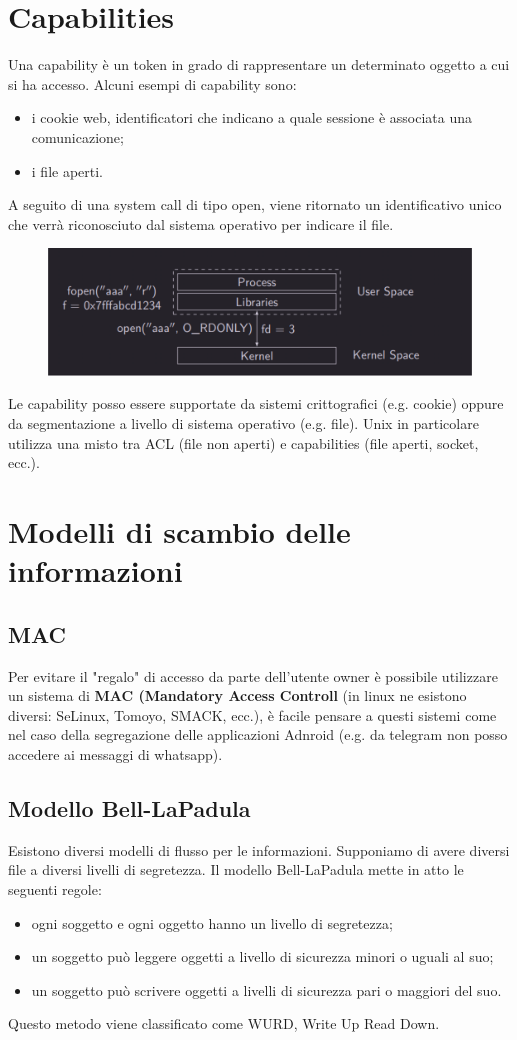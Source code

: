 \section{Capabilities}
Una capability è un token in grado di rappresentare un determinato oggetto a cui si ha accesso. Alcuni esempi di capability sono: 
\begin{itemize}
    \item i cookie web, identificatori che indicano a quale sessione è associata una comunicazione;
    \item i file aperti.
\end{itemize}
A seguito di una system call di tipo open, viene ritornato un identificativo unico che verrà riconosciuto dal sistema operativo per indicare il file.
\begin{figure}[h!]
    \centering
    \includegraphics[width=.6\linewidth]{res/capabilities.png}
    \caption{}
\end{figure}
Le capability posso essere supportate da sistemi crittografici (e.g. cookie) oppure da segmentazione a livello di sistema operativo (e.g. file).
Unix in particolare utilizza una misto tra ACL (file non aperti) e capabilities (file aperti, socket, ecc.).

\section{Modelli di scambio delle informazioni}

\subsection{MAC}
Per evitare il "regalo" di accesso da parte dell'utente owner è possibile utilizzare un sistema di \textbf{MAC (Mandatory Access Controll} (in linux ne esistono diversi: SeLinux, Tomoyo, SMACK, ecc.), è facile pensare a questi sistemi come nel caso della segregazione delle applicazioni Adnroid (e.g. da telegram non posso accedere ai messaggi di whatsapp).

\subsection{Modello Bell-LaPadula}
Esistono diversi modelli di flusso per le informazioni. Supponiamo di avere diversi file a diversi livelli di segretezza. Il modello Bell-LaPadula mette in atto le seguenti regole:
\begin{itemize}
    \item ogni soggetto e ogni oggetto hanno un livello di segretezza;
    \item un soggetto può leggere oggetti a livello di sicurezza minori o uguali al suo;
    \item un soggetto può scrivere oggetti a livelli di sicurezza pari o maggiori del suo. 
\end{itemize}
Questo metodo viene classificato come WURD, Write Up Read Down.

